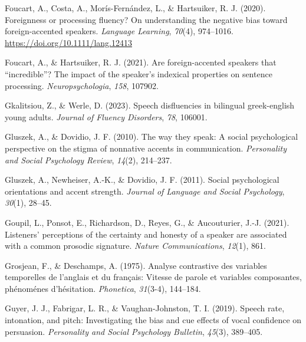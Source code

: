 \documentclass[
  man,floatsintext]{apa7}
\newlength{\cslhangindent}
\newlength{\cslentryspacingunit} %
\newenvironment{CSLReferences}[2] %
 {%
  \setlength{\parindent}{0pt}
  \ifodd #1
  \let\oldpar\par
  \def\par{\hangindent=\cslhangindent\oldpar}
  \fi
  \setlength{\parskip}{#2\cslentryspacingunit}
 }%
 {}
\begin{document}
\begin{CSLReferences}{1}{0}
\leavevmode{}%
Foucart, A., Costa, A., Morís-Fernández, L., \& Hartsuiker, R. J. (2020). Foreignness or processing {fluency? On} understanding the negative bias toward foreign-accented speakers. \emph{Language Learning}, \emph{70}(4), 974--1016. \url{https://doi.org/10.1111/lang.12413}

\leavevmode{}%
Foucart, A., \& Hartsuiker, R. J. (2021). Are foreign-accented speakers that {``incredible''}? The impact of the speaker's indexical properties on sentence processing. \emph{Neuropsychologia}, \emph{158}, 107902.

\leavevmode{}%
Gkalitsiou, Z., \& Werle, D. (2023). Speech disfluencies in bilingual greek-english young adults. \emph{Journal of Fluency Disorders}, \emph{78}, 106001.

\leavevmode{}%
Gluszek, A., \& Dovidio, J. F. (2010). The way they speak: A social psychological perspective on the stigma of nonnative accents in communication. \emph{Personality and Social Psychology Review}, \emph{14}(2), 214--237.

\leavevmode{}%
Gluszek, A., Newheiser, A.-K., \& Dovidio, J. F. (2011). Social psychological orientations and accent strength. \emph{Journal of Language and Social Psychology}, \emph{30}(1), 28--45.

\leavevmode{}%
Goupil, L., Ponsot, E., Richardson, D., Reyes, G., \& Aucouturier, J.-J. (2021). Listeners' perceptions of the certainty and honesty of a speaker are associated with a common prosodic signature. \emph{Nature Communications}, \emph{12}(1), 861.

\leavevmode{}%
Grosjean, F., \& Deschamps, A. (1975). Analyse contrastive des variables temporelles de l'anglais et du fran{ç}ais: Vitesse de parole et variables composantes, ph{é}nom{é}nes d'h{é}sitation. \emph{Phonetica}, \emph{31}(3-4), 144--184.

\leavevmode{}%
Guyer, J. J., Fabrigar, L. R., \& Vaughan-Johnston, T. I. (2019). Speech rate, intonation, and pitch: Investigating the bias and cue effects of vocal confidence on persuasion. \emph{Personality and Social Psychology Bulletin}, \emph{45}(3), 389--405.


\end{CSLReferences}
\end{document}
